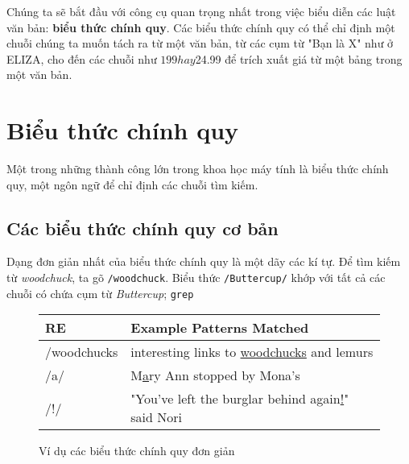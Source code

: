 Chúng ta sẽ bắt đầu với công cụ quan trọng nhất trong việc biểu diễn các luật văn bản: \textbf{biểu thức chính quy}. Các biểu thức chính quy có thể chỉ định một chuỗi chúng ta muốn tách ra từ một văn bản, từ các cụm từ "Bạn là X" như ở ELIZA, cho đến các chuỗi như $199 hay $24.99 để trích xuất giá từ một bảng trong một văn bản.

\section{Biểu thức chính quy}

Một trong những thành công lớn trong khoa học máy tính là biểu thức chính quy, một ngôn ngữ để chỉ định các chuỗi tìm kiếm.

\subsection{Các biểu thức chính quy cơ bản}

Dạng đơn giản nhất của biểu thức chính quy là một dãy các kí tự. Để tìm kiếm từ \textit{woodchuck}, ta gõ \verb|/woodchuck|. Biểu thức \verb|/Buttercup/| khớp với tất cả các chuỗi có chứa cụm từ \textit{Buttercup}; \verb|grep|

\begin{figure}[h]
	\begin{tabular}{ l l }
	 \hline
	 RE & Example Patterns Matched \\
	 \hline
	 /woodchucks & interesting links to \underline{woodchucks} and lemurs \\
	 /a/ & M\underline{a}ry Ann stopped by Mona's  \\
	 /!/ & "You've left the burglar behind again\underline{!}" said Nori \\
	 \hline
	\end{tabular}
 \caption{Ví dụ các biểu thức chính quy đơn giản}
 \label{table:1}
\end{figure}